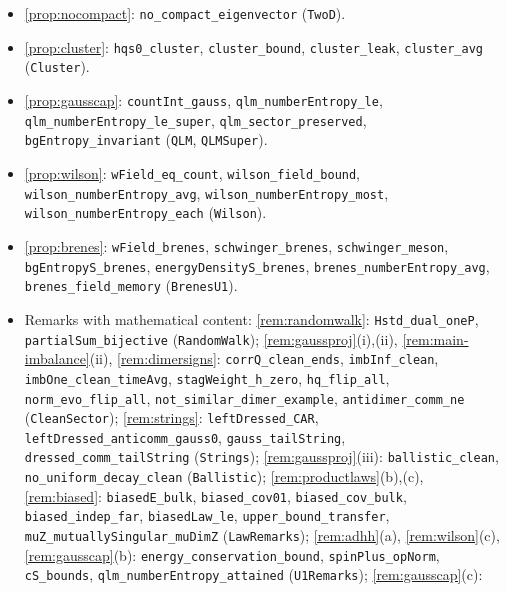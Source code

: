 \begin{itemize}[leftmargin=1.5em,itemsep=1pt]
\texttt{checkerboard\_evo\_eigvec}, \texttt{checkerboard\_evo}, \texttt{Ks\_sq\_diag}
(\texttt{Graph}, \texttt{GraphFlux}, \texttt{TwoD}, \texttt{TwoDLaws}).
\item \cref{prop:nocompact}: \texttt{no\_compact\_eigenvector} (\texttt{TwoD}).
\item \cref{prop:cluster}: \texttt{hqs0\_cluster}, \texttt{cluster\_bound}, \texttt{cluster\_leak},
\texttt{cluster\_avg} (\texttt{Cluster}).
\item \cref{prop:gausscap}: \texttt{countInt\_gauss}, \texttt{qlm\_numberEntropy\_le},
\texttt{qlm\_numberEntropy\_le\_super}, \texttt{qlm\_sector\_preserved}, \texttt{bgEntropy\_invariant}
(\texttt{QLM}, \texttt{QLMSuper}).
\item \cref{prop:wilson}: \texttt{wField\_eq\_count}, \texttt{wilson\_field\_bound},
\texttt{wilson\_numberEntropy\_avg}, \texttt{wilson\_numberEntropy\_most},
\texttt{wilson\_numberEntropy\_each} (\texttt{Wilson}).
\item \cref{prop:brenes}: \texttt{wField\_brenes}, \texttt{schwinger\_brenes}, \texttt{schwinger\_meson},
\texttt{bgEntropyS\_brenes}, \texttt{energyDensityS\_brenes}, \texttt{brenes\_numberEntropy\_avg},
\texttt{brenes\_field\_memory} (\texttt{BrenesU1}).
\item Remarks with mathematical content: \cref{rem:randomwalk}: \texttt{Hstd\_dual\_oneP},
\texttt{partialSum\_bijective} (\texttt{RandomWalk}); \cref{rem:gaussproj}(i),(ii), \cref{rem:main-imbalance}(ii),
\cref{rem:dimersigns}: \texttt{corrQ\_clean\_ends}, \texttt{imbInf\_clean}, \texttt{imbOne\_clean\_timeAvg},
\texttt{stagWeight\_h\_zero}, \texttt{hq\_flip\_all}, \texttt{norm\_evo\_flip\_all},
\texttt{not\_similar\_dimer\_example}, \texttt{antidimer\_comm\_ne} (\texttt{CleanSector}); \cref{rem:strings}:
\texttt{leftDressed\_CAR}, \texttt{leftDressed\_anticomm\_gauss0}, \texttt{gauss\_tailString},
\texttt{dressed\_comm\_tailString} (\texttt{Strings}); \cref{rem:gaussproj}(iii): \texttt{ballistic\_clean},
\texttt{no\_uniform\_decay\_clean} (\texttt{Ballistic}); \cref{rem:productlaws}(b),(c), \cref{rem:biased}:
\texttt{biasedE\_bulk}, \texttt{biased\_cov01}, \texttt{biased\_cov\_bulk}, \texttt{biased\_indep\_far},
\texttt{biasedLaw\_le}, \texttt{upper\_bound\_transfer}, \texttt{muZ\_mutuallySingular\_muDimZ}
(\texttt{LawRemarks}); \cref{rem:adhh}(a), \cref{rem:wilson}(c), \cref{rem:gausscap}(b):
\texttt{energy\_conservation\_bound}, \texttt{spinPlus\_opNorm}, \texttt{cS\_bounds},
\texttt{qlm\_numberEntropy\_attained} (\texttt{U1Remarks}); \cref{rem:gausscap}(c):

\end{itemize}
